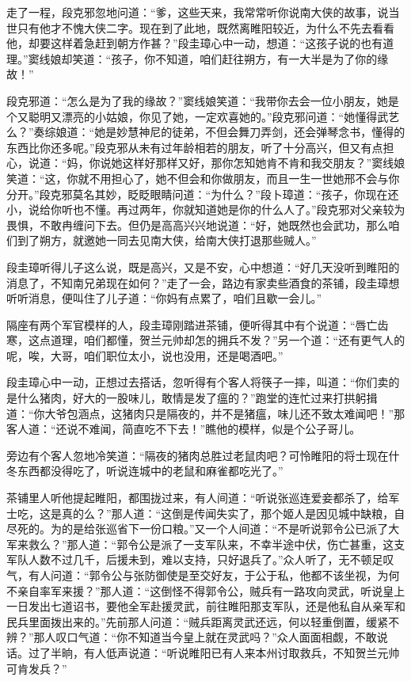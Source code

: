 \documentclass[12pt,oneside]{book}
\begin{document}
走了一程，段克邪忽地问道：``爹，这些天来，我常常听你说南大侠的故事，说当世只有他才不愧大侠二字。现在到了此地，既然离睢阳较近，为什么不先去看看他，却要这样着急赶到朝方作甚？''段圭璋心中一动，想道：``这孩子说的也有道理。''窦线娘却笑道：``孩子，你不知道，咱们赶往朔方，有一大半是为了你的缘故！''

段克邪道：``怎么是为了我的缘故？''窦线娘笑道：``我带你去会一位小朋友，她是个又聪明又漂亮的小姑娘，你见了她，一定欢喜她的。''段克邪问道：``她懂得武艺么？''奏综娘道：``她是妙慧神尼的徒弟，不但会舞刀弄剑，还会弹琴念书，懂得的东西比你还多呢。''段克邪从未有过年龄相若的朋友，听了十分高兴，但又有点担心，说道：``妈，你说她这样好那样又好，那你怎知她肯不肯和我交朋友？''窦线娘笑道：``这，你就不用担心了，她不但会和你做朋友，而且一生一世她邢不会与你分开。''段克邪莫名其妙，眨眨眼睛问道：``为什么？''段卜璋道：``孩子，你现在还小，说给你听也不懂。再过两年，你就知道她是你的什么人了。''段克邪对父亲较为畏惧，不敢冉缠问下去。但仍是高高兴兴地说道：``好，她既然也会武功，那么咱们到了朔方，就邀她一同去见南大侠，给南大侠打退那些贼人。''

段圭璋听得儿子这么说，既是高兴，又是不安，心中想道：``好几天没听到睢阳的消息了，不知南兄弟现在如何？''走了一会，路边有家卖些酒食的茶铺，段圭璋想听听消息，便叫住了儿子道：``你妈有点累了，咱们且歇一会儿。''

隔座有两个军官模样的人，段圭璋刚踏进茶铺，便听得其中有个说道：``唇亡齿寒，这点道理，咱们都懂，贺兰元帅却怎的拥兵不发？''另一个道：``还有更气人的呢，唉，大哥，咱们职位太小，说也没用，还是喝酒吧。''

段圭璋心中一动，正想过去搭话，忽听得有个客人将筷子一摔，叫道：``你们卖的是什么猪肉，好大的一股味儿，敢情是发了瘟的？''跑堂的连忙过来打拱躬揖道：``你大爷包涵点，这猪肉只是隔夜的，并不是猪瘟，味儿还不致太难闻吧！''那客人道：``还说不难闻，简直吃不下去！''瞧他的模样，似是个公子哥儿。

旁边有个客人忽地冷笑道：``隔夜的猪肉总胜过老鼠肉吧？可怜睢阳的将士现在什冬东西都没得吃了，听说连城中的老鼠和麻雀都吃光了。''

茶铺里人听他提起睢阳，都围拢过来，有人间道：``听说张巡连爱妾都杀了，给军士吃，这是真的么？''那人道：``这倒是传闻失实了，那个姬人是因见城中缺粮，自尽死的。为的是给张巡省下一份口粮。''又一个人间道：``不是听说郭令公已派了大军来救么？''那人道：``郭令公是派了一支军队来，不幸半途中伏，伤亡甚重，这支军队人数不过几千，后援未到，难以支持，只好退兵了。''众人听了，无不顿足叹气，有人问道：``郭令公与张防御使是至交好友，于公于私，他都不该坐视，为何不亲自率军来援？''那人道：``这倒怪不得郭令公，贼兵有一路攻向灵武，听说皇上一日发出七道诏书，要他全军赴援灵武，前往睢阳那支军队，还是他私自从亲军和民兵里面拨出来的。''先前那人问道：``贼兵距离灵武还远，何以轻重倒置，缓紧不辨？''那人叹口气道：``你不知道当今皇上就在灵武吗？''众人面面相觑，不敢说话。过了半晌，有人低声说道：``听说睢阳已有人来本州讨取救兵，不知贺兰元帅可肯发兵？''
\end{document}
